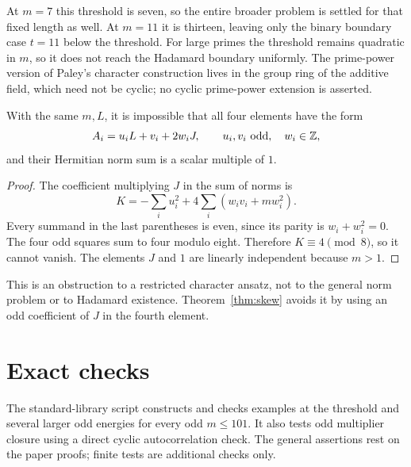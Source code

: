 At $m=7$ this threshold is seven, so the entire broader problem is
settled for that fixed length as well. At $m=11$ it is thirteen, leaving
only the binary boundary case $t=11$ below the threshold. For large
primes the threshold remains quadratic in $m$, so it does not reach
the Hadamard boundary uniformly. The prime-power version of Paley's
character construction lives in the group ring of the additive field,
which need not be cyclic; no cyclic prime-power extension is asserted.

\begin{proposition}
With the same $m,L$, it is impossible that all four elements have the
form
\[
 A_i=u_iL+v_i+2w_iJ,\qquad u_i,v_i\text{ odd},\quad w_i\in\mathbb Z,
\]
and their Hermitian norm sum is a scalar multiple of $1$.
\end{proposition}
\begin{proof}
The coefficient multiplying $J$ in the sum of norms is
\[
 K=-\sum_i u_i^2+4\sum_i(w_iv_i+mw_i^2).
\]
Every summand in the last parentheses is even, since its parity is
$w_i+w_i^2=0$. The four odd squares sum to four modulo eight.
Therefore $K\equiv4\pmod8$, so it cannot vanish. The elements $J$ and
$1$ are linearly independent because $m>1$.
\end{proof}
This is an obstruction to a restricted character ansatz, not to the
general norm problem or to Hadamard existence. Theorem~\ref{thm:skew}
avoids it by using an odd coefficient of $J$ in the fourth element.

\section*{Exact checks}
The standard-library script  constructs and
checks examples at the threshold and several larger odd energies for
every odd $m\le101$. It also tests odd multiplier closure using a direct
cyclic autocorrelation check. The general assertions rest on the paper
proofs; finite tests are additional checks only.
